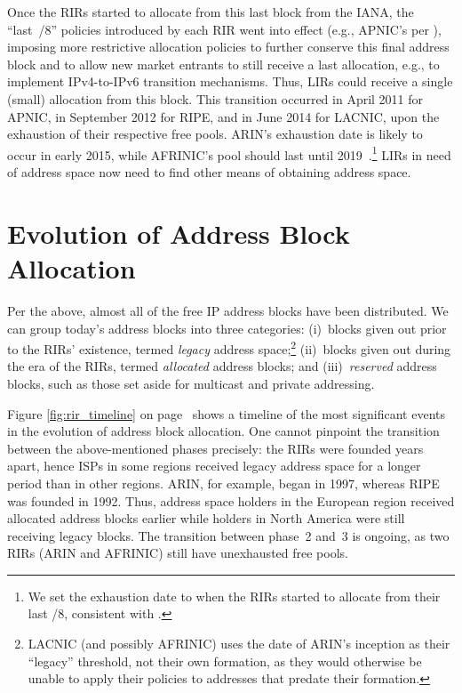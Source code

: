 \documentclass[letter]{sigcomm-alternate}
\begin{document}
Once the RIRs started to allocate from this last block from the IANA, the
``last~/8'' policies introduced by each RIR went into effect (e.g., APNIC's per
\cite{apnic_lastslash8}), imposing more restrictive allocation policies to 
further conserve this final address block and to allow new market entrants to 
still receive a last allocation, e.g., to implement IPv4-to-IPv6 transition 
mechanisms. Thus, LIRs could receive a single (small) allocation from this 
block. This transition occurred in April 2011 for APNIC, in September 2012 for 
RIPE, and in June 2014 for LACNIC, upon the exhaustion of their respective free pools. 
ARIN's exhaustion date is likely to occur in early 2015, while AFRINIC's pool 
should last until 2019~\cite{potaroo}.\footnote{
	We set the exhaustion date to when the RIRs started to
	allocate from their last /8, consistent with \cite{potaroo}.
}
LIRs in need of address space now need to find other means of obtaining
address space.

\section{Evolution of Address Block Allocation} 

Per the above, almost all of the free IP address blocks have
been distributed.  We can group today's address blocks into three
categories: (i)~blocks given out prior to the RIRs' existence, termed
\textit{legacy} address space;\footnote{LACNIC (and possibly AFRINIC)
  uses the date of ARIN's inception as their ``legacy'' threshold, not
  their own formation, as they would otherwise be unable to apply their
  policies to addresses that predate their formation.}
(ii)~blocks given
out during the era of the RIRs, termed \textit{allocated} address
blocks; and (iii)~\emph{reserved} address blocks, such as those set
aside for multicast and private addressing.

Figure \ref{fig:rir_timeline} on page~\pageref{fig:rir_timeline} shows a timeline of the most
significant events in the evolution of address block allocation.
One cannot pinpoint the transition between the above-mentioned phases 
precisely: the RIRs were founded years apart, hence ISPs 
in some regions received legacy address space for a longer period than in other
regions. ARIN, for example, began in 1997, whereas RIPE was founded in
1992. Thus, address space holders in the European region received allocated
address blocks earlier while holders in North America were still receiving legacy
blocks. The transition between phase~2 and~3 is ongoing, as two RIRs (ARIN and 
AFRINIC) still have unexhausted free pools.
\end{document}
